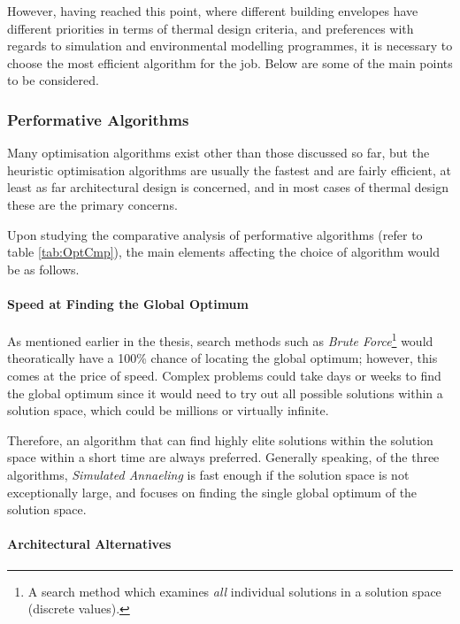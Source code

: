 However, having reached this point, where different building envelopes have different priorities in terms of thermal design criteria, and preferences with regards to simulation and environmental modelling programmes, it is necessary to choose the most efficient algorithm for the job. Below are some of the main points to be considered.

\subsubsection{Performative Algorithms}

Many optimisation algorithms exist other than those discussed so far, but the heuristic optimisation algorithms are usually the fastest and are fairly efficient, at least as far architectural design is concerned, and in most cases of thermal design these are the primary concerns.

Upon studying the comparative analysis of performative algorithms (refer to table \ref{tab:OptCmp}), the main elements affecting the choice of algorithm would be as follows.

\paragraph{Speed at Finding the Global Optimum}\mbox{}\vspace{-0.4cm}

As mentioned earlier in the thesis, search methods such as \emph{Brute Force}\footnote{A search method which examines \emph{all} individual solutions in a solution space (discrete values).} would theoratically have a 100\% chance of locating the global optimum; however, this comes at the price of speed. Complex problems could take days or weeks to find the global optimum since it would need to try out all possible solutions within a solution space, which could be millions or virtually infinite.

Therefore, an algorithm that can find highly elite solutions within the solution space within a short time are always preferred. Generally speaking, of the three algorithms, \emph{Simulated Annaeling} is fast enough if the solution space is not exceptionally large, and focuses on finding the single global optimum of the solution space.

\paragraph{Architectural Alternatives}\mbox{}\vspace{-0.4cm}

